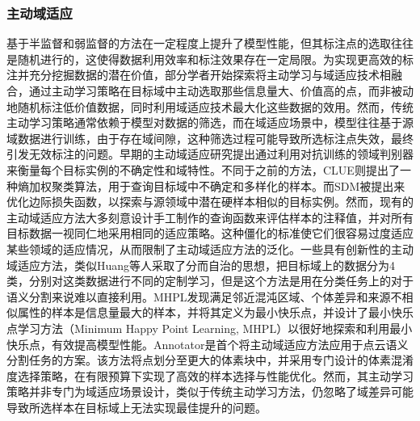\subsubsection{主动域适应}
基于半监督和弱监督的方法在一定程度上提升了模型性能，但其标注点的选取往往是随机进行的，这使得数据利用效率和标注效果存在一定局限。为实现更高效的标注并充分挖掘数据的潜在价值，部分学者开始探索将主动学习与域适应技术相融合，通过主动学习策略在目标域中主动选取那些信息量大、价值高的点，而非被动地随机标注低价值数据，同时利用域适应技术最大化这些数据的效用。然而，传统主动学习策略通常依赖于模型对数据的筛选，而在域适应场景中，模型往往基于源域数据进行训练，由于存在域间隙，这种筛选过程可能导致所选标注点失效，最终引发无效标注的问题。早期的主动域适应研究提出通过利用对抗训练的领域判别器来衡量每个目标实例的不确定性和域特性。不同于之前的方法，CLUE则提出了一种熵加权聚类算法，用于查询目标域中不确定和多样化的样本。而SDM被提出来优化边际损失函数，以探索与源领域中潜在硬样本相似的目标实例。然而，现有的主动域适应方法大多刻意设计手工制作的查询函数来评估样本的注释值，并对所有目标数据一视同仁地采用相同的适应策略。这种僵化的标准使它们很容易过度适应某些领域的适应情况，从而限制了主动域适应方法的泛化。一些具有创新性的主动域适应方法，类似Huang等人采取了分而自治的思想，把目标域上的数据分为4类，分别对这类数据进行不同的定制学习，但是这个方法是用在分类任务上的对于语义分割来说难以直接利用。MHPL发现满足邻近混沌区域、个体差异和来源不相似属性的样本是信息量最大的样本，并将其定义为最小快乐点，并设计了最小快乐点学习方法（Minimum Happy Point Learning, MHPL）以很好地探索和利用最小快乐点，有效提高模型性能。Annotator是首个将主动域适应方法应用于点云语义分割任务的方案。该方法将点划分至更大的体素块中，并采用专门设计的体素混淆度选择策略，在有限预算下实现了高效的样本选择与性能优化。然而，其主动学习策略并非专门为域适应场景设计，类似于传统主动学习方法，仍忽略了域差异可能导致所选样本在目标域上无法实现最佳提升的问题。

